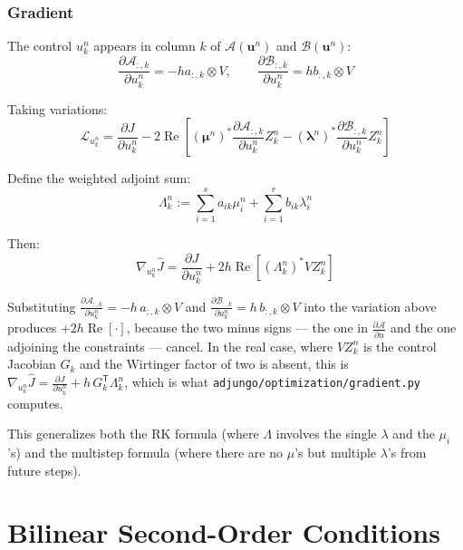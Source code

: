 \documentclass[11pt]{article}
\newcommand{\LL}{\mathcal{L}}
\newcommand{\herm}{^\ast}
\renewcommand{\Re}{\operatorname{Re}}
\newcommand{\pder}[2]{\frac{\partial #1}{\partial #2}}
\newcommand{\uv}{\mathbf{u}}
\newcommand{\lv}{\boldsymbol{\lambda}}
\newcommand{\mv}{\boldsymbol{\mu}}
\newcommand{\Av}{\mathcal{A}}
\newcommand{\Bv}{\mathcal{B}}
\begin{document}
\subsubsection{Gradient}

The control $u_k^n$ appears in column $k$ of $\Av(\uv^n)$ and $\Bv(\uv^n)$:
\begin{equation}
\pder{\Av_{:,k}}{u_k^n} = -h a_{:,k} \otimes V, \qquad \pder{\Bv_{:,k}}{u_k^n} = h b_{:,k} \otimes V
\end{equation}

Taking variations:
\begin{equation}
\LL_{u_k^n} = \pder{J}{u_k^n} - 2\Re\left[ (\mv^n)\herm \pder{\Av_{:,k}}{u_k^n} Z_k^n - (\lv^n)\herm \pder{\Bv_{:,k}}{u_k^n} Z_k^n \right]
\end{equation}

Define the weighted adjoint sum:
\begin{equation}
\Lambda_k^n := \sum_{i=1}^s a_{ik} \mu_i^n + \sum_{i=1}^r b_{ik} \lambda_i^n
\end{equation}

Then:
\begin{equation}
\boxed{\nabla_{u_k^n} \hat{J} = \pder{J}{u_k^n} + 2h\Re\left[ (\Lambda_k^n)\herm V Z_k^n \right]}
\end{equation}

Substituting $\pder{\Av_{:,k}}{u_k^n} = -h\, a_{:,k} \otimes V$ and
$\pder{\Bv_{:,k}}{u_k^n} = h\, b_{:,k} \otimes V$ into the variation above
produces $+2h\Re[\cdot]$, because the two minus signs --- the one in
$\pder{\Av}{u}$ and the one adjoining the constraints --- cancel. In the real
case, where $V Z_k^n$ is the control Jacobian $G_k$ and the Wirtinger factor of
two is absent, this is
$\nabla_{u_k^n}\hat J = \pder{J}{u_k^n} + h\, G_k^{\mathsf{T}} \Lambda_k^n$, which is
what \texttt{adjungo/optimization/gradient.py} computes.

This generalizes both the RK formula (where $\Lambda$ involves the single $\lambda$ and the $\mu_i$'s) and the multistep formula (where there are no $\mu$'s but multiple $\lambda$'s from future steps).

\section{Bilinear Second-Order Conditions}
\end{document}
